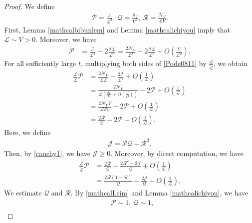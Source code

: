 \documentclass[reqno]{amsart}
\theoremstyle{plain}
\theoremstyle{definition}
\numberwithin{equation}{section}
\begin{document}
\begin{proof}
We define
\begin{align*}
\mathcal{P}=\frac{\mathcal{I}}{\mathcal{L}^2},\ \mathcal{Q}=\frac{\mathcal{S}_V}{V^2},\ \mathcal{R}=\frac{\mathcal{N}_V}{\mathcal{L}V}.
\end{align*}
First, Lemma \ref{mathcalbibunlem} and Lemma \ref{mathcalichiyou} imply that $\dot{\mathcal L}\sim V>0$. Moreover, we have
\begin{align}\label{Pode0811}
\dot{\mathcal{P}}&=\frac{\dot{\mathcal{I}}}{\mathcal{L}^2}-2\frac{\mathcal{I}\dot{\mathcal{L}}}{\mathcal{L}^3}=\frac{2\mathcal{N}_V}{\mathcal{L}^2}-2\frac{\mathcal{I}\dot{\mathcal{L}}}{\mathcal{L}^3}+O\left(\frac{V}{\mathcal{L}^2}\right).
\end{align}
For all sufficiently large $t$, multiplying both sides of \eqref{Pode0811} by $\frac{\mathcal{L}}{\dot{\mathcal{L}}}$, we obtain
\begin{align*}
\frac{\mathcal{L}}{\dot{\mathcal{L}}}\dot{\mathcal{P}}&=\frac{2\mathcal{N}_V}{\mathcal{L}\dot{\mathcal{L}}}-\frac{2\mathcal{I}}{\mathcal{L}^2}+O\left(\frac{1}{\mathcal{L}}\right)
\\
&=\frac{2\mathcal{N}_V}{\mathcal{L}\left(\frac{\mathcal{S}_V}{V}+O\left(\frac{V}{D}\right)\right)}-2\mathcal{P}+O\left(\frac{1}{\mathcal{L}}\right)
\\
&=\frac{2\mathcal{N}_VV}{\mathcal{L}\mathcal{S}_V}-2\mathcal{P}+O\left(\frac{1}{\mathcal{L}}\right)
\\
&=\frac{2\mathcal{R}}{\mathcal{Q}}-2\mathcal{P}+O\left(\frac{1}{\mathcal{L}}\right).
\end{align*}
Here, we define
\begin{align*}
\mathcal{J}=\mathcal{P}\mathcal{Q}-\mathcal{R}^2.
\end{align*}
Then, by \eqref{cauchy1}, we have $\mathcal{J}\geq 0$. Moreover, by direct computation, we have
\begin{align*}
\frac{\mathcal{L}}{\dot{\mathcal{L}}}\dot{\mathcal{P}}&=\frac{2\mathcal{R}}{\mathcal{Q}}-\frac{2\mathcal{R}^2+2\mathcal{J}}{\mathcal{Q}}+O\left(\frac{1}{\mathcal{L}}\right)
\\
&=\frac{2\mathcal{R}(1-\mathcal{R})}{\mathcal{Q}}-\frac{2\mathcal{J}}{\mathcal{Q}}+O\left(\frac{1}{\mathcal{L}}\right).
\end{align*}
We estimate $\mathcal{Q}$ and $\mathcal{R}$. By \eqref{mathcalLsim} and Lemma \ref{mathcalichiyou}, we have
\begin{align*}
&\mathcal{P}\sim 1,\ \mathcal{Q}\sim 1,
\\

\end{align*}
\end{proof}
\end{document}
